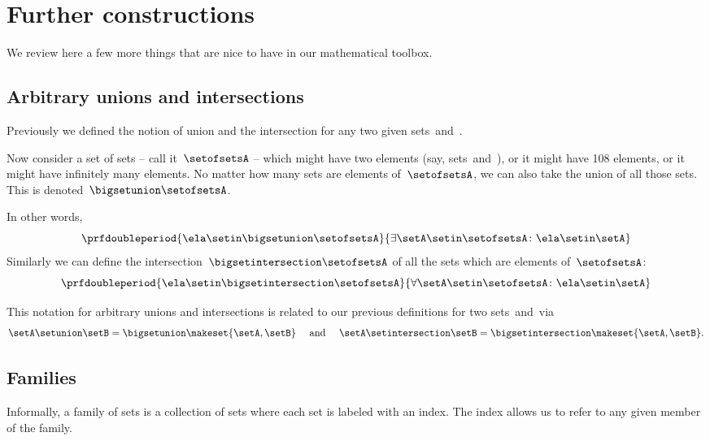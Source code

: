 
\section{Further constructions}
\label{sec:more-constructions}

We review here a few more things that are nice to have in our mathematical toolbox.

\subsection{Arbitrary unions and intersections}

Previously we defined the notion of union and the intersection for any two given sets~\setA and~\setB.

Now consider a set of sets -- call it~$\setofsetsA$ -- which might have two elements (say, sets~\setA and~\setB), or it might have 108 elements, or it might have infinitely many elements.
No matter how many sets are elements of~$\setofsetsA$, we can also take the union of all those sets.
This is denoted~$\bigsetunion \setofsetsA$.

In other words,
%
\begin{equation}
    \prfdoubleperiod{ \ela \setin\bigsetunion \setofsetsA }{\exists \setA \setin\setofsetsA \colon \ela \setin\setA}
\end{equation}
%
Similarly we can define the intersection~$\bigsetintersection \setofsetsA$ of all the sets which are elements of~$\setofsetsA$:
%
\begin{equation}
    \prfdoubleperiod{\ela \setin\bigsetintersection \setofsetsA}{\forall \setA \setin\setofsetsA \colon \ela \setin\setA}
\end{equation}

This notation for arbitrary unions and intersections is related to our previous definitions for two sets~\setA and~\setB via
\begin{equation}
    \setA \setunion \setB = \bigsetunion \makeset{ \setA, \setB } \quad \text{ and } \quad \setA \setintersection \setB = \bigsetintersection \makeset{ \setA, \setB }.
\end{equation}

\subsection{Families}

Informally, a family of sets is a collection of sets where each set is labeled with an index.
The index allows us to refer to any given member of the family.

